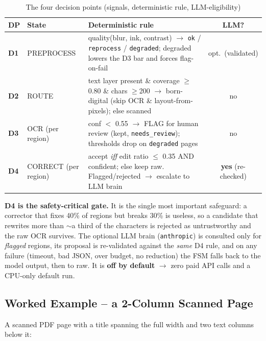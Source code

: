 \documentclass[12pt,a4paper]{article}
\begin{document}
\begin{table}[H]
\centering
\caption{The four decision points (signals, deterministic rule, LLM-eligibility)}
\small
\begin{tabularx}{\linewidth}{@{} l l L c @{}}
\toprule
\textbf{DP} & \textbf{State} & \textbf{Deterministic rule} & \textbf{LLM?} \\
\midrule
\textbf{D1} & PREPROCESS & quality(blur, ink, contrast) $\rightarrow$ \texttt{ok} / \texttt{reprocess} / \texttt{degraded}; degraded lowers the D3 bar and forces flag-on-fail & opt.\ (validated) \\
\textbf{D2} & ROUTE & text layer present \& coverage $\ge$0.80 \& chars $\ge$200 $\rightarrow$ born-digital (skip OCR \& layout-from-pixels); else scanned & no \\
\textbf{D3} & OCR (per region) & conf $<$ 0.55 $\rightarrow$ FLAG for human review (kept, \texttt{needs\_review}); thresholds drop on \texttt{degraded} pages & no \\
\textbf{D4} & CORRECT (per region) & accept \emph{iff} edit ratio $\le$ 0.35 AND confident; else keep raw. Flagged/rejected $\rightarrow$ escalate to LLM brain & \textbf{yes} (re-checked) \\
\bottomrule
\end{tabularx}
\end{table}

\textbf{D4 is the safety-critical gate.} It is the single most important safeguard: a corrector that fixes 40\% of regions but breaks 30\% is useless, so a candidate that rewrites more than $\sim$a third of the characters is rejected as untrustworthy and the raw OCR survives. The optional LLM brain (\texttt{anthropic}) is consulted only for \emph{flagged} regions, its proposal is re-validated against the \emph{same} D4 rule, and on any failure (timeout, bad JSON, over budget, no reduction) the FSM falls back to the model output, then to raw. It is \textbf{off by default} $\rightarrow$ zero paid API calls and a CPU-only default run.

\subsection{Worked Example -- a 2-Column Scanned Page}

A scanned PDF page with a title spanning the full width and two text columns below it:
\end{document}
